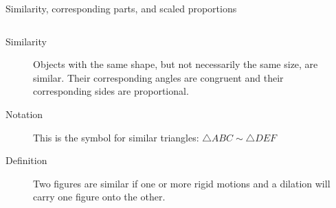 \documentclass[onlytextwidth, aspectratio=169]{beamer}
\begin{document}
\begin{frame}{Similarity, corresponding parts, and scaled proportions}
  \begin{columns}
      \begin{description}
        \item[Similarity] Objects with the same shape, but not necessarily the same size, are similar. Their corresponding angles are congruent and their corresponding sides are proportional.
        \item[Notation] This is the symbol for similar triangles: $\triangle ABC \sim \triangle DEF$
        \item[Definition] Two figures are similar if one or more rigid motions and a dilation will carry one figure onto the other.
      \end{description}
    \begin{flushright}
    \end{flushright}
  \end{columns}
\end{frame}
\end{document}
